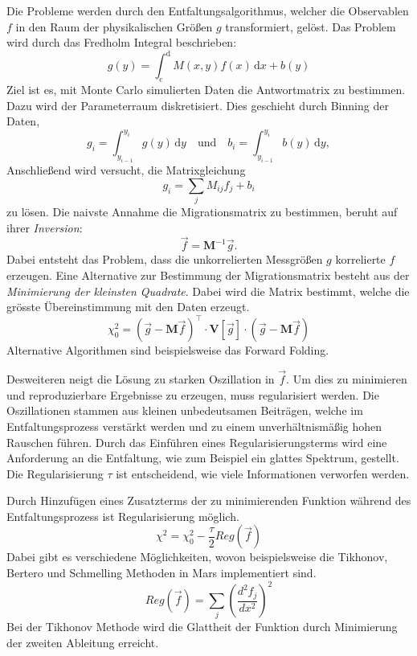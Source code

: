 Die Probleme werden durch den Entfaltungsalgorithmus,
welcher die Observablen $f$
in den Raum der physikalischen Größen $g$ transformiert,
gelöst.
Das Problem wird durch das Fredholm Integral beschrieben:
\begin{equation}
	g(y) = \int_\text{c}^\text{d} M(x,y) f(x) \, \text{d}x + b(y)
\end{equation}
Ziel ist es, mit Monte Carlo simulierten Daten
die Antwortmatrix zu bestimmen.
Dazu wird der Parameterraum diskretisiert.
Dies geschieht durch Binning der Daten,
\begin{equation}
	g_i = \int_{y_{i-1}}^{y_i} g(y) \, \text{d}y \quad \text{und} \quad
	b_i = \int_{y_{i-1}}^{y_i} b(y) \, \text{d}y,
\end{equation}
Anschließend wird versucht, die Matrixgleichung
\begin{equation}
	g_i = \sum_j M_{ij} f_j + b_i
\end{equation}
zu lösen.
Die naivste Annahme die Migrationsmatrix zu bestimmen,
beruht auf ihrer \textit{Inversion}:
\begin{equation}
    \vec{f} = \mathbf{M}^{-1} \vec{g}.
\end{equation}
Dabei entsteht das Problem, dass die unkorrelierten Messgrößen $g$
korrelierte $f$ erzeugen.
Eine Alternative zur Bestimmung der Migrationsmatrix
besteht aus der \textit{Minimierung der kleinsten Quadrate}.
Dabei wird die Matrix bestimmt,
welche die grösste Übereinstimmung mit den Daten erzeugt.
\begin{equation}
    \chi^2_0 = {\left( \vec{g} - \mathbf{M} \vec{f} \right)}^\intercal
        \cdot \mathbf{V} \left[ \vec{g} \right] \cdot
        \left( \vec{g} - \mathbf{M} \vec{f} \right)
\end{equation}
Alternative Algorithmen sind beispielsweise das Forward Folding.

Desweiteren neigt die Lösung zu starken Oszillation in $\vec{f}$.
Um dies zu minimieren und reproduzierbare Ergebnisse zu erzeugen,
muss regularisiert werden.
Die Oszillationen stammen aus kleinen unbedeutsamen Beiträgen, welche im
Entfaltungsprozess verstärkt werden und zu einem unverhältnismäßig hohen
Rauschen führen.
Durch das Einführen eines Regularisierungsterms wird eine Anforderung an die
Entfaltung, wie zum Beispiel ein glattes Spektrum, gestellt.
Die Regularisierung $\tau$ ist entscheidend, wie viele
Informationen verworfen werden.

Durch Hinzufügen eines Zusatzterms der zu minimierenden Funktion während des
Entfaltungsprozess ist Regularisierung möglich.
\begin{equation}
    \chi^2 = \chi^2_0 - \frac{\tau}{2} Reg(\vec{f})
\end{equation}
Dabei gibt es verschiedene Möglichkeiten,
wovon beispielsweise die Tikhonov, Bertero
und Schmelling Methoden in Mars implementiert sind.
\begin{equation}
    Reg(\vec{f}) = \sum_j {\left( \frac{d^2 f_j}{dx^2} \right)}^2
\end{equation}
Bei der Tikhonov Methode wird die Glattheit der
Funktion durch Minimierung der zweiten Ableitung erreicht.

